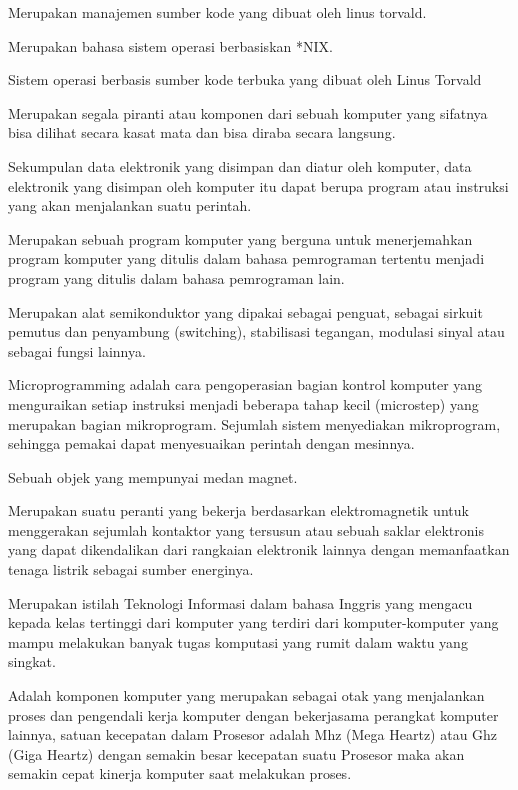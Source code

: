 Merupakan manajemen sumber kode yang dibuat oleh linus torvald.

Merupakan bahasa sistem operasi berbasiskan *NIX.

Sistem operasi berbasis sumber kode terbuka yang dibuat oleh Linus Torvald

Merupakan segala piranti atau komponen dari sebuah komputer yang sifatnya bisa dilihat secara kasat mata dan bisa diraba secara langsung. 

Sekumpulan data elektronik yang disimpan dan diatur oleh komputer, data elektronik yang disimpan oleh komputer itu dapat berupa program atau instruksi yang akan menjalankan suatu perintah.

Merupakan sebuah program komputer yang berguna untuk menerjemahkan program komputer yang ditulis dalam bahasa pemrograman tertentu menjadi program yang ditulis dalam bahasa pemrograman lain.

Merupakan alat semikonduktor yang dipakai sebagai penguat, sebagai sirkuit pemutus dan penyambung (switching), stabilisasi tegangan, modulasi sinyal atau sebagai fungsi lainnya.

Microprogramming adalah cara pengoperasian bagian kontrol komputer yang menguraikan setiap instruksi menjadi beberapa tahap kecil (microstep) yang merupakan bagian mikroprogram. Sejumlah sistem menyediakan mikroprogram, sehingga pemakai dapat menyesuaikan perintah dengan mesinnya.

Sebuah objek yang mempunyai medan magnet.

Merupakan suatu peranti yang bekerja berdasarkan elektromagnetik untuk menggerakan sejumlah kontaktor yang tersusun atau sebuah saklar elektronis yang dapat dikendalikan dari rangkaian elektronik lainnya dengan memanfaatkan tenaga listrik sebagai sumber energinya.

Merupakan istilah Teknologi Informasi dalam bahasa Inggris yang mengacu kepada kelas tertinggi dari komputer yang terdiri dari komputer-komputer yang mampu melakukan banyak tugas komputasi yang rumit dalam waktu yang singkat.

Adalah komponen komputer yang merupakan sebagai otak yang menjalankan proses dan pengendali kerja komputer dengan bekerjasama perangkat komputer lainnya, satuan kecepatan dalam Prosesor adalah Mhz (Mega Heartz) atau Ghz (Giga Heartz) dengan semakin besar kecepatan suatu Prosesor maka akan semakin cepat kinerja komputer saat melakukan proses.